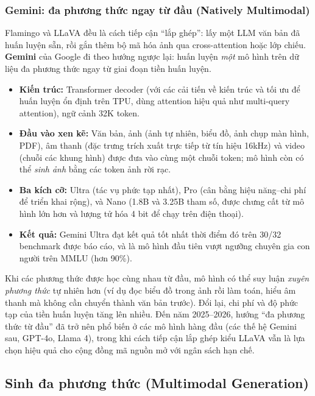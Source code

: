 \subsubsection{Gemini: đa phương thức ngay từ đầu (Natively Multimodal)}
\label{sssec:gemini}
Flamingo và LLaVA đều là cách tiếp cận “lắp ghép”: lấy một LLM văn bản đã huấn luyện sẵn, rồi gắn thêm bộ mã hóa ảnh qua cross-attention hoặc lớp chiếu. \textbf{Gemini} \cite{geminiteam2023gemini} của Google đi theo hướng ngược lại: huấn luyện \emph{một} mô hình trên dữ liệu đa phương thức ngay từ giai đoạn tiền huấn luyện.
\begin{itemize}
	\item \textbf{Kiến trúc:} Transformer decoder (với các cải tiến về kiến trúc và tối ưu để huấn luyện ổn định trên TPU, dùng attention hiệu quả như multi-query attention), ngữ cảnh 32K token.
	\item \textbf{Đầu vào xen kẽ:} Văn bản, ảnh (ảnh tự nhiên, biểu đồ, ảnh chụp màn hình, PDF), âm thanh (đặc trưng trích xuất trực tiếp từ tín hiệu 16kHz) và video (chuỗi các khung hình) được đưa vào cùng một chuỗi token; mô hình còn có thể \emph{sinh ảnh} bằng các token ảnh rời rạc.
	\item \textbf{Ba kích cỡ:} Ultra (tác vụ phức tạp nhất), Pro (cân bằng hiệu năng--chi phí để triển khai rộng), và Nano (1.8B và 3.25B tham số, được chưng cất từ mô hình lớn hơn và lượng tử hóa 4 bit để chạy trên điện thoại).
	\item \textbf{Kết quả:} Gemini Ultra đạt kết quả tốt nhất thời điểm đó trên 30/32 benchmark được báo cáo, và là mô hình đầu tiên vượt ngưỡng chuyên gia con người trên MMLU (hơn 90\%).
\end{itemize}
Khi các phương thức được học cùng nhau từ đầu, mô hình có thể suy luận \emph{xuyên phương thức} tự nhiên hơn (ví dụ đọc biểu đồ trong ảnh rồi làm toán, hiểu âm thanh mà không cần chuyển thành văn bản trước). Đổi lại, chi phí và độ phức tạp của tiền huấn luyện tăng lên nhiều. Đến năm 2025--2026, hướng “đa phương thức từ đầu” đã trở nên phổ biến ở các mô hình hàng đầu (các thế hệ Gemini sau, GPT-4o, Llama 4), trong khi cách tiếp cận lắp ghép kiểu LLaVA vẫn là lựa chọn hiệu quả cho cộng đồng mã nguồn mở với ngân sách hạn chế.

\subsection{Sinh đa phương thức (Multimodal Generation)}
\label{ssec:multimodal_generation}

